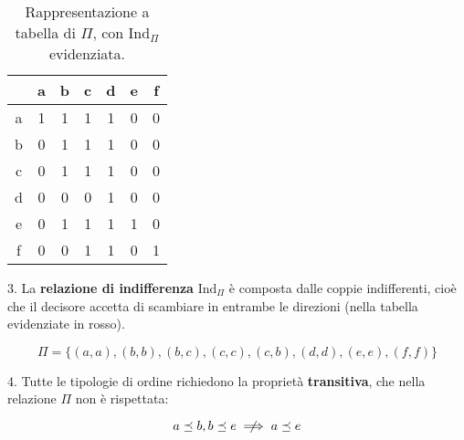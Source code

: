 \documentclass[\main/main.tex]{subfiles}
\begin{document}
\begin{table}
  \begin{tabular}{|c|c|c|c|c|c|c|}
    \hline
      & a                    & b                    & c                    & d                    & e                    & f                    \\
    \hline
    a & \cellcolor{red!25} 1 & 1                    & 1                    & 1                    & 0                    & 0                    \\
    \hline
    b & 0                    & \cellcolor{red!25} 1 & \cellcolor{red!25} 1 & 1                    & 0                    & 0                    \\
    \hline
    c & 0                    & \cellcolor{red!25} 1 & \cellcolor{red!25} 1 & 1                    & 0                    & 0                    \\
    \hline
    d & 0                    & 0                    & 0                    & \cellcolor{red!25} 1 & 0                    & 0                    \\
    \hline
    e & 0                    & 1                    & 1                    & 1                    & \cellcolor{red!25} 1 & 0                    \\
    \hline
    f & 0                    & 0                    & 1                    & 1                    & 0                    & \cellcolor{red!25} 1 \\
    \hline
  \end{tabular}
  \caption{Rappresentazione a tabella di $\Pi$, con $\text{Ind}_\Pi$ evidenziata.}
\end{table}

3. La \textbf{relazione di indifferenza} $\text{Ind}_\Pi$ è composta dalle coppie indifferenti, cioè che il decisore accetta di scambiare in entrambe le direzioni (nella tabella evidenziate in rosso).

\[
  \Pi = \{(a, a), (b, b), (b,c), (c, c), (c, b), (d,d),(e,e),(f,f)\}
\]

4. Tutte le tipologie di ordine richiedono la proprietà \textbf{transitiva}, che nella relazione $\Pi$ non è rispettata:

\[
  a \preceq b, b \preceq e \centernot\implies a \preceq e
\]
\end{document}
